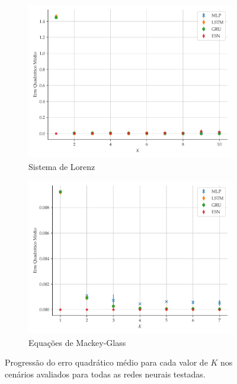 \documentclass[a4paper, 12pt]{article}
\begin{document}
\begin{figure}[!ht]
     \begin{subfigure}[t]{0.45\textwidth}
         \includegraphics[scale=0.4]{progressao-k-lorenz.pdf}
         \caption{Sistema de Lorenz}
     \end{subfigure}
     \centering
     \begin{subfigure}[t]{0.45\textwidth} 
         \includegraphics[scale=0.4]{progressao-k-mackeyglass.pdf}
         \caption{Equações de Mackey-Glass}
     \end{subfigure}  
     \centering   
     \caption{Progressão do erro quadrático médio para cada valor de $K$ nos cenários avaliados para todas as redes neurais testadas.}
     \label{fig:mse-progression}
\end{figure}
\end{document}
